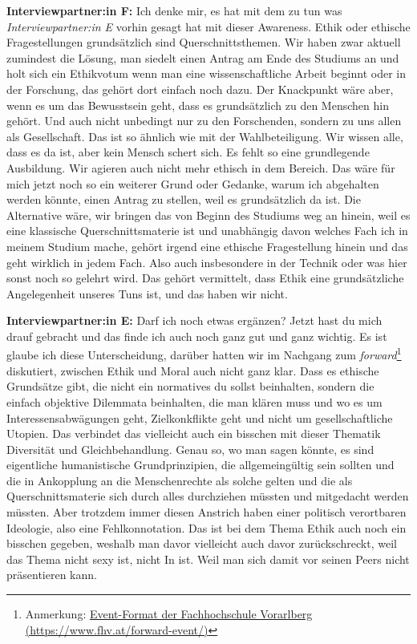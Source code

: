 \documentclass[a4paper,12pt,twoside]{scrreprt}
\begin{document}
\textbf{Interviewpartner:in F:} Ich denke mir, es hat mit dem zu tun was \textit{Interviewpartner:in E} vorhin gesagt hat mit dieser Awareness. Ethik oder ethische Fragestellungen grundsätzlich sind Querschnittsthemen. Wir haben zwar aktuell zumindest die Lösung, man siedelt einen Antrag am Ende des Studiums an und holt sich ein Ethikvotum wenn man eine wissenschaftliche Arbeit beginnt oder in der Forschung, das gehört dort einfach noch dazu. Der Knackpunkt wäre aber, wenn es um das Bewusstsein geht, dass es grundsätzlich zu den Menschen hin gehört. Und auch nicht unbedingt nur zu den Forschenden, sondern zu uns allen als Gesellschaft. Das ist so ähnlich wie mit der Wahlbeteiligung. Wir wissen alle, dass es da ist, aber kein Mensch schert sich. Es fehlt so eine grundlegende Ausbildung. Wir agieren auch nicht mehr ethisch in dem Bereich. Das wäre für mich jetzt noch so ein weiterer Grund oder Gedanke, warum ich abgehalten werden könnte, einen Antrag zu stellen, weil es grundsätzlich da ist. Die Alternative wäre, wir bringen das von Beginn des Studiums weg an hinein, weil es eine klassische Querschnittsmaterie ist und unabhängig davon welches Fach ich in meinem Studium mache, gehört irgend eine ethische Fragestellung hinein und das geht wirklich in jedem Fach. Also auch insbesondere in der Technik oder was hier sonst noch so gelehrt wird. Das gehört vermittelt, dass Ethik eine grundsätzliche Angelegenheit unseres Tuns ist, und das haben wir nicht.

\textbf{Interviewpartner:in E:} Darf ich noch etwas ergänzen? Jetzt hast du mich drauf gebracht und das finde ich auch noch ganz gut und ganz wichtig. Es ist glaube ich diese Unterscheidung, darüber hatten wir im Nachgang zum \textit{forward}\footnote{Anmerkung: \href{https://www.fhv.at/forward-event/}{Event-Format der Fachhochschule Vorarlberg (\url{https://www.fhv.at/forward-event/})}} diskutiert, zwischen Ethik und Moral auch nicht ganz klar. Dass es ethische Grundsätze gibt, die nicht ein normatives du sollst beinhalten, sondern die einfach objektive Dilemmata beinhalten, die man klären muss und wo es um Interessensabwägungen geht, Zielkonkflikte geht und nicht um gesellschaftliche Utopien. Das verbindet das vielleicht auch ein bisschen mit dieser Thematik Diversität und Gleichbehandlung. Genau so, wo man sagen könnte, es sind eigentliche humanistische Grundprinzipien, die allgemeingültig sein sollten und die in Ankopplung an die Menschenrechte als solche gelten und die als Querschnittsmaterie sich durch alles durchziehen müssten und mitgedacht werden müssten. Aber trotzdem immer diesen Anstrich haben einer politisch verortbaren Ideologie, also eine Fehlkonnotation. Das ist bei dem Thema Ethik auch noch ein bisschen gegeben, weshalb man davor vielleicht auch davor zurückschreckt, weil das Thema nicht sexy ist, nicht In ist. Weil man sich damit vor seinen Peers nicht präsentieren kann.
\end{document}
